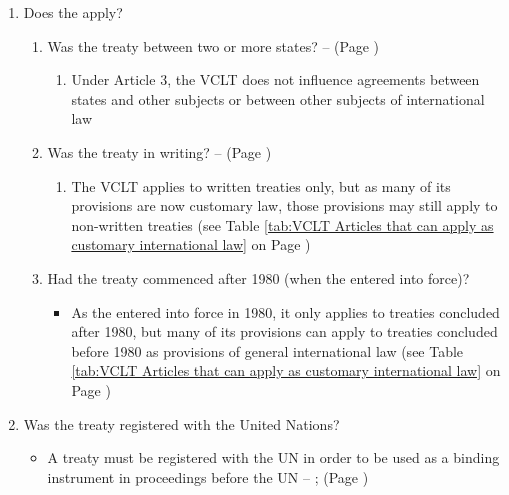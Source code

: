 \begin{enumerate}
\begin{enumerate}
\begin{enumerate}
\begin{enumerate}
            \end{enumerate}
        \end{enumerate}
    \end{enumerate}
    \item Does the  apply?
    \begin{enumerate}
        \item Was the treaty between two or more states? --  (Page \pageref{VCLT Art 3})
        \begin{enumerate}
            \item Under Article 3, the VCLT does not influence agreements between states and other subjects or between other subjects of international law
        \end{enumerate}
        \item Was the treaty in writing? --  (Page \pageref{VCLT Art 3})
        \begin{enumerate}
            \item The VCLT applies to written treaties only, but as many of its provisions are now customary law, those provisions may still apply to non-written treaties (see Table \ref{tab:VCLT Articles that can apply as customary international law} on Page \pageref{tab:VCLT Articles that can apply as customary international law})
        \end{enumerate}
        \item Had the treaty commenced after 1980 (when the  entered into force)?
        \begin{itemize}
            \item As the  entered into force in 1980, it only applies to treaties concluded after 1980, but many of its provisions can apply to treaties concluded before 1980 as provisions of general international law (see Table \ref{tab:VCLT Articles that can apply as customary international law} on Page \pageref{tab:VCLT Articles that can apply as customary international law})
        \end{itemize}
    \end{enumerate}
    \item Was the treaty registered with the United Nations?
    \begin{itemize}
        \item A treaty must be registered with the UN in order to be used as a binding instrument in proceedings before the UN -- ;  (Page \pageref{convention:UN Charter Art 102})

\end{itemize}
\end{enumerate}
